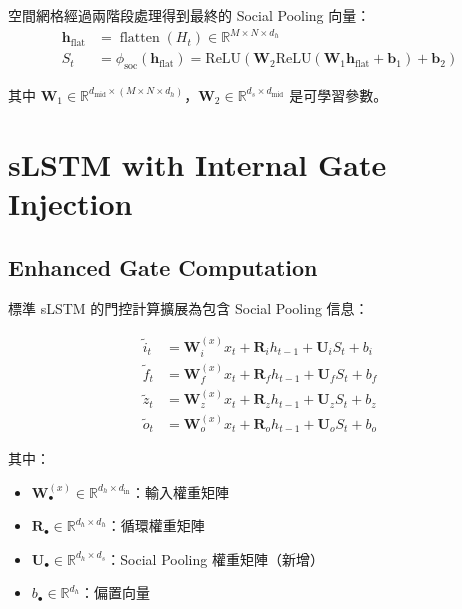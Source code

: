 \documentclass[11pt,a4paper]{article}
\begin{document}
空間網格經過兩階段處理得到最終的 Social Pooling 向量：
\begin{align}
\mathbf{h}_{\text{flat}} &= \operatorname{flatten}(H_t) \in \mathbb{R}^{M \times N \times d_h} \\
S_t &= \phi_{\text{soc}}(\mathbf{h}_{\text{flat}}) = \text{ReLU}(\mathbf{W}_2 \text{ReLU}(\mathbf{W}_1 \mathbf{h}_{\text{flat}} + \mathbf{b}_1) + \mathbf{b}_2)
\end{align}

其中 $\mathbf{W}_1 \in \mathbb{R}^{d_{\text{mid}} \times (M \times N \times d_h)}$，$\mathbf{W}_2 \in \mathbb{R}^{d_s \times d_{\text{mid}}}$ 是可學習參數。

\section{sLSTM with Internal Gate Injection}

\subsection{Enhanced Gate Computation}

標準 sLSTM 的門控計算擴展為包含 Social Pooling 信息：

\begin{align}
\tilde{i}_t &= \mathbf{W}_i^{(x)} x_t + \mathbf{R}_i h_{t-1} + \mathbf{U}_i S_t + b_i \label{eq:slstm_input_gate} \\
\tilde{f}_t &= \mathbf{W}_f^{(x)} x_t + \mathbf{R}_f h_{t-1} + \mathbf{U}_f S_t + b_f \label{eq:slstm_forget_gate} \\
\tilde{z}_t &= \mathbf{W}_z^{(x)} x_t + \mathbf{R}_z h_{t-1} + \mathbf{U}_z S_t + b_z \label{eq:slstm_candidate} \\
\tilde{o}_t &= \mathbf{W}_o^{(x)} x_t + \mathbf{R}_o h_{t-1} + \mathbf{U}_o S_t + b_o \label{eq:slstm_output_gate}
\end{align}

其中：
\begin{itemize}
\item $\mathbf{W}_{\bullet}^{(x)} \in \mathbb{R}^{d_h \times d_{\text{in}}}$：輸入權重矩陣
\item $\mathbf{R}_{\bullet} \in \mathbb{R}^{d_h \times d_h}$：循環權重矩陣
\item $\mathbf{U}_{\bullet} \in \mathbb{R}^{d_h \times d_s}$：Social Pooling 權重矩陣（新增）
\item $b_{\bullet} \in \mathbb{R}^{d_h}$：偏置向量
\end{itemize}
\end{document}
